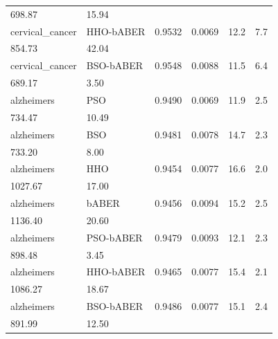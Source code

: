 \begin{table}[htbp]
\begin{tabular}{llcccc}
698.87 & 15.94 \\
cervical_cancer & HHO-bABER & 0.9532 & 0.0069 & 12.2 & 7.7 \\
854.73 & 42.04 \\
cervical_cancer & BSO-bABER & 0.9548 & 0.0088 & 11.5 & 6.4 \\
689.17 & 3.50 \\
\hline
alzheimers & PSO & 0.9490 & 0.0069 & 11.9 & 2.5 \\
734.47 & 10.49 \\
alzheimers & BSO & 0.9481 & 0.0078 & 14.7 & 2.3 \\
733.20 & 8.00 \\
alzheimers & HHO & 0.9454 & 0.0077 & 16.6 & 2.0 \\
1027.67 & 17.00 \\
alzheimers & bABER & 0.9456 & 0.0094 & 15.2 & 2.5 \\
1136.40 & 20.60 \\
alzheimers & PSO-bABER & 0.9479 & 0.0093 & 12.1 & 2.3 \\
898.48 & 3.45 \\
alzheimers & HHO-bABER & 0.9465 & 0.0077 & 15.4 & 2.1 \\
1086.27 & 18.67 \\
alzheimers & BSO-bABER & 0.9486 & 0.0077 & 15.1 & 2.4 \\
891.99 & 12.50 \\
\hline
\end{tabular}
\end{table}
